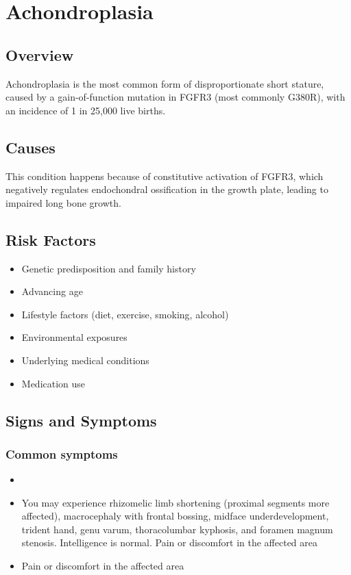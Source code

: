 \chapter{Achondroplasia}
\label{sec:Achondroplasia}

\section{Overview}
Achondroplasia is the most common form of disproportionate short stature, caused by a gain-of-function mutation in FGFR3 (most commonly G380R), with an incidence of 1 in 25,000 live births.
\section{Causes}
This condition happens because of constitutive activation of FGFR3, which negatively regulates endochondral ossification in the growth plate, leading to impaired long bone growth.     
\section{Risk Factors}

\begin{itemize}[noitemsep]
  \item Genetic predisposition and family history
  \item Advancing age
  \item Lifestyle factors (diet, exercise, smoking, alcohol)
  \item Environmental exposures
  \item Underlying medical conditions
  \item Medication use
\end{itemize}
\section{Signs and Symptoms}

\subsection{Common symptoms}
\begin{itemize}[noitemsep]
  \item \item You may experience rhizomelic limb shortening (proximal segments more affected), macrocephaly with frontal bossing, midface underdevelopment, trident hand, genu varum, thoracolumbar kyphosis, and foramen magnum stenosis. Intelligence is normal. Pain or discomfort in the affected area    \item Pain or discomfort in the affected area
  \end{itemize}

